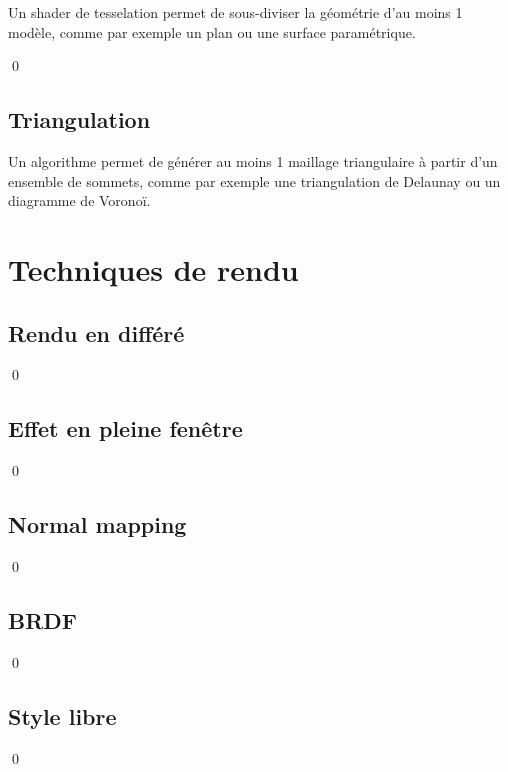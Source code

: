 \documentclass[12pt]{article}
\newcommand{\state}{\noindent}
\begin{document}
\state
Un shader de tesselation permet de sous-diviser la géométrie d'au moins 1 modèle, comme par exemple un plan ou une surface paramétrique.

\qed

\subsection{Triangulation}

\state
Un algorithme permet de générer au moins 1 maillage triangulaire à partir d'un ensemble de sommets, comme par exemple une triangulation de Delaunay ou un diagramme de Voronoï.

\pagebreak


\pagebreak

\section{Techniques de rendu}

\subsection{Rendu en différé}

\state

\qed

\subsection{Effet en pleine fenêtre}

\state

\qed

\subsection{Normal mapping}

\state

\qed

\subsection{BRDF}

\state

\qed

\subsection{Style libre}

\state

\qed
\end{document}
